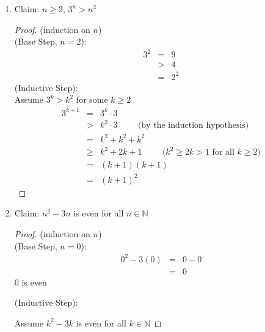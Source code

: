 \documentclass{article}
\begin{document}
\begin{enumerate}
\begin{enumerate}
\begin{proof}
        \end{proof}
        \item Claim: $n \geq 2$, $3^n > n^2$
        \begin{proof}
            (induction on $n$) \\
            (Base Step, $n=2$):
            \begin{eqnarray}
                3^2 &=& 9 \\
                &>& 4 \\
                &=& 2^2
            \end{eqnarray}
            (Inductive Step): \\
            Assume $3^k > k^2$ for some $k \geq 2$
            \begin{eqnarray}
                3^{k+1} &=& 3^k \cdot 3 \\
                &>& k^2 \cdot 3 \hspace{1cm} \text{(by the induction hypothesis)} \\
                &=& k^2 + k^2 + k^2 \\
                &\geq& k^2 + 2k + 1 \hspace{1cm} \text{($k^2 \geq 2k > 1$ for all $k \geq 2$)}\\
                &=& (k+1)(k+1) \\
                &=& (k+1)^2
            \end{eqnarray}
        \end{proof}
        \item Claim: $n^2 -3n$ is even for all $n \in \mathbb{N}$
        \begin{proof}
            (induction on $n$) \\
            (Base Step, $n = 0$):
            \begin{eqnarray}
                0^2 - 3(0) &=& 0 - 0 \\
                &=& 0
            \end{eqnarray}
            \hspace{1cm} $0$ is even

            (Inductive Step): 

            \hspace{1cm} Assume $k^2 -3k$ is even for all $k \in \mathbb{N}$ 


\end{proof}
\end{enumerate}
\end{enumerate}
\end{document}
